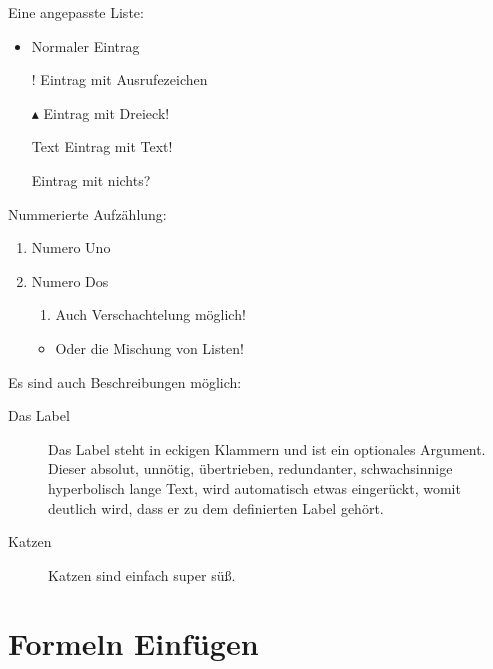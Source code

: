 Eine angepasste Liste:
\begin{itemize}
    \item Normaler Eintrag
    \item [!] Eintrag mit Ausrufezeichen
    \item [$\blacktriangle$] Eintrag mit Dreieck!
    \item [Text] Eintrag mit Text!
    \item [] Eintrag mit nichts?
\end{itemize}

Nummerierte Aufzählung:
\begin{enumerate}
    \item Numero Uno
    \item Numero Dos
          \begin{enumerate}
              \item 	Auch Verschachtelung möglich!
          \end{enumerate}
          \begin{itemize}
              \item Oder die Mischung von Listen!
          \end{itemize}
\end{enumerate}

Es sind auch Beschreibungen möglich:
\begin{description}
    \item[Das Label] Das Label steht in eckigen Klammern und ist ein optionales Argument. Dieser absolut, unnötig, übertrieben, redundanter, schwachsinnige hyperbolisch lange Text, wird automatisch etwas eingerückt, womit deutlich wird, dass er zu dem definierten Label gehört.
    \item[Katzen] Katzen sind einfach super süß.
\end{description}

\chapter{Formeln Einfügen}

